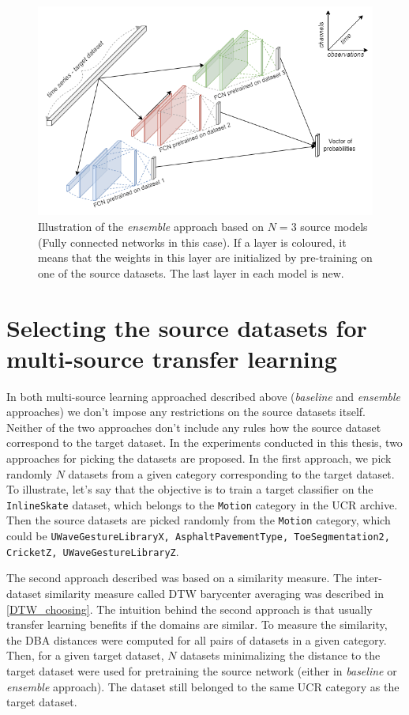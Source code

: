 \documentclass[a4paper,11pt,twoside]{report}
\theoremstyle{definition}
\begin{document}
\FloatBarrier
\begin{figure}[h!]
\centering
\includegraphics[width=17cm]{imgs/ensemble_architecture.png}
\caption{Illustration of the\textit{ ensemble }approach based on $N=3$ source models (Fully connected networks in this case). If a layer is coloured, it means that the weights in this layer are initialized by pre-training on one of the source datasets. The last layer in each model is new.}
\label{fig:ensemble_architecture}
\end{figure}

\FloatBarrier


\section{Selecting the source datasets for multi-source transfer learning}\label{section:selecting}
In both multi-source learning approached described above (\textit{baseline} and \textit{ensemble} approaches) we don't impose any restrictions on the source datasets itself. Neither of the two approaches don't include any rules how the source dataset correspond to the target dataset. In the experiments conducted in this thesis, two approaches for picking the datasets are proposed. In the first approach, we pick randomly $N$ datasets from a given category corresponding to the target dataset. To illustrate, let's say that the objective is to train a target classifier on the \texttt{InlineSkate} dataset, which belongs to the \texttt{Motion} category in the UCR archive. Then the source datasets are picked randomly from the \texttt{Motion} category, which could be \texttt{UWaveGestureLibraryX, AsphaltPavementType, ToeSegmentation2, CricketZ, UWaveGestureLibraryZ}.


The second approach described was based on a similarity measure. The inter-dataset similarity measure called DTW barycenter averaging was described in \ref{DTW_choosing}. The intuition behind the second approach is that usually transfer learning benefits if the domains are similar. To measure the similarity, the DBA distances were computed for all pairs of datasets in a given category. Then, for a given target dataset, $N$ datasets minimalizing the distance to the target dataset were used for pretraining the source network (either in \textit{baseline} or \textit{ensemble} approach). The dataset still belonged to the same UCR category as the target dataset.
\end{document}
